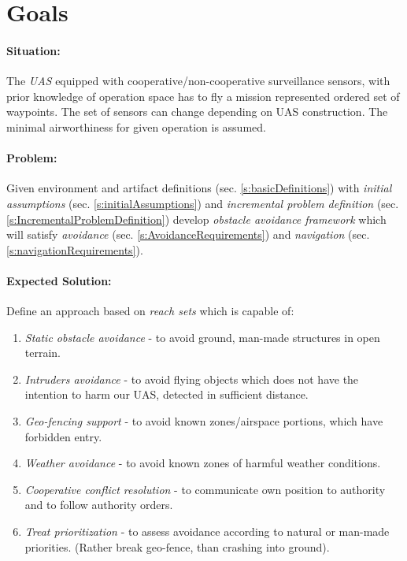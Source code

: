 \section{Goals}\label{s:goals}
\paragraph{Situation:} The \emph{UAS} equipped with cooperative/non-cooperative surveillance sensors, with prior knowledge of operation space has to fly a mission represented ordered set of waypoints. The set of sensors can change depending on UAS construction. The minimal airworthiness for given operation is assumed.

\paragraph{Problem:} Given environment and artifact definitions (sec. \ref{s:basicDefinitions}) with \emph{initial assumptions} (sec. \ref{s:initialAssumptions}) and \emph{incremental problem definition} (sec. \ref{s:IncrementalProblemDefinition}) develop \emph{obstacle avoidance framework} which will satisfy \emph{avoidance} (sec. \ref{s:AvoidanceRequirements}) and \emph{navigation} (sec. \ref{s:navigationRequirements}).

\paragraph{Expected Solution:} Define an approach based on \emph{reach sets} which is capable of:

\begin{enumerate}
    \item \emph{Static obstacle avoidance} - to avoid ground, man-made structures in open terrain. 
    
    \item \emph{Intruders avoidance} - to avoid flying objects which does not have the intention to harm our UAS, detected in sufficient distance. 

    \item \emph{Geo-fencing support} - to avoid known zones/airspace portions, which have forbidden entry.

    \item \emph{Weather avoidance} - to avoid known zones of harmful weather conditions.

    \item \emph{Cooperative conflict resolution} - to communicate own position to authority and to follow authority orders.
    
    \item \emph{Treat prioritization} - to assess avoidance according to natural or man-made priorities. (Rather break geo-fence, than crashing into ground).
\end{enumerate}

